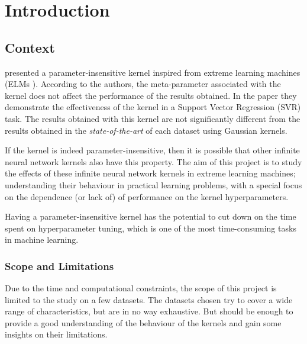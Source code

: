 \chapter{Introduction}
\label{sec:introduction}

\section{Context}


\Textcite{frenayParameterinsensitiveKernelExtreme2011} presented a
parameter-insensitive kernel inspired from extreme learning machines (ELMs
\cite{huangExtremeLearningMachine2006}).
According to the authors, the meta-parameter associated with the kernel does
not affect the performance of the results obtained. In the paper they demonstrate
the effectiveness of the kernel in a Support Vector Regression (SVR) task. The results
obtained with this kernel are not significantly different from the results obtained
in the \emph{state-of-the-art} of each dataset using Gaussian kernels.

If the kernel is indeed parameter-insensitive, then it is possible that other
infinite neural network kernels also have this property.
The aim of this project is to study the effects of these infinite neural network
kernels in extreme learning machines; understanding their behaviour in practical
learning problems, with a special focus on the dependence (or lack of) of
performance on the kernel hyperparameters.

Having a parameter-insensitive kernel has the potential to cut down on the
time spent on hyperparameter tuning, which is one of the most time-consuming
tasks in machine learning.

\subsection{Scope and Limitations}%
\label{sub:scope_and_limitations}

Due to the time and computational constraints, the scope of this project is limited
to the study on a few datasets. The datasets chosen try to cover a wide range of
characteristics, but are in no way exhaustive. But should be enough to provide
a good understanding of the behaviour of the kernels and gain some insights
on their limitations.


